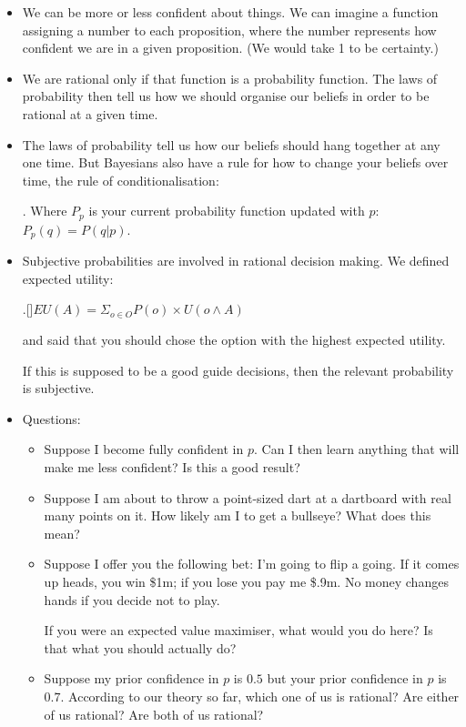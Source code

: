 \documentclass[justified]{tufte-handout}
\begin{document}
\begin{itemize}

\item We can be more or less confident about things. We can imagine a function assigning a number to each proposition, where the number represents how confident we are in a given proposition. (We would take 1 to be certainty.)

\item We are rational only if that function is a probability function. The laws of probability then tell us how we should organise our beliefs in order to be rational at a given time.

\item The laws of probability tell us how our beliefs should hang together at any one time. But Bayesians also have a rule for how to change your beliefs over time, the rule of conditionalisation:

\ex. Where $P_p$ is your current probability function updated with $p$: $P_p(q)= P(q|p)$.


\item Subjective probabilities are involved in rational decision making. We defined expected utility:


\ex.[]$EU(A) = \Sigma_{o\in O} P(o)\times U(o \wedge A)$

and said that you should chose the option with the highest expected utility.

If this is supposed to be a good guide decisions, then the relevant probability is subjective.



\item Questions:

\begin{itemize}


\item Suppose I become fully confident in $p$. Can I then learn anything that will make me less confident? Is this a good result?




\item Suppose I am about to throw a point-sized dart at a dartboard with real many points on it. How likely am I to get a bullseye? What does this mean?

\item Suppose I offer you the following bet: I'm going to flip a going. If it comes up heads, you win \$1m; if you lose you pay me \$.9m. No money changes hands if you decide not to play. 

If you were an expected value maximiser, what would you do here? Is that what you should actually do?

\item Suppose my prior confidence in $p$ is $0.5$ but your prior confidence in $p$ is $0.7$. According to our theory so far, which one of us is rational? Are either of us rational? Are both of us rational?


\end{itemize}


\end{itemize}
\end{document}
